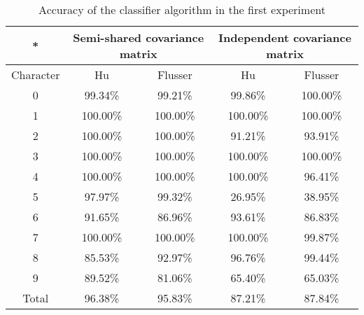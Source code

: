 \documentclass[10pt,journal]{IEEEtran}
\begin{document}
	\begin{table}
	\begin{center}
	\begin{tabular}{|c|c|c|c|c|}
		\hline
		* & \multicolumn{2}{|c|}{Semi-shared covariance matrix} &
			\multicolumn{2}{|c|}{Independent covariance matrix} \\
		\hline
		Character & Hu & Flusser & Hu & Flusser \\
		\hline
		0 & 99.34\% & 99.21\% & 99.86\% & 100.00\% \\
		1 &	100.00\% & 100.00\% & 100.00\% & 100.00\% \\
		2 &	100.00\% & 100.00\% & 91.21\% & 93.91\% \\
		3 &	100.00\% & 100.00\% & 100.00\% & 100.00\% \\
		4 &	100.00\% & 100.00\%	& 100.00\% & 96.41\% \\		
		5 & 97.97\% & 99.32\% & 26.95\% & 38.95\% \\ 
		6 & 91.65\% & 86.96\% & 93.61\% & 86.83\% \\
		7 & 100.00\% & 100.00\% & 100.00\% & 99.87\% \\
		8 & 85.53\% & 92.97\% & 96.76\% & 99.44\% \\
		9 &	89.52\% & 81.06\% & 65.40\% & 65.03\% \\
		\hline
		Total & 96.38\% & 95.83\% & 87.21\% & 87.84\% \\
		\hline
	\end{tabular}
	\end{center}
	\caption{Accuracy of the classifier algorithm in the first experiment}	
	\label{exp1}
	\end{table}
	
\end{document}
